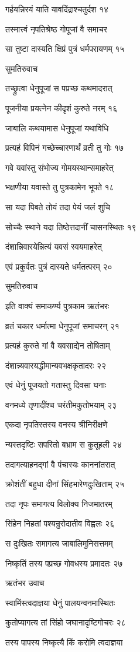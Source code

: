 गर्हयन्निरयं याति यावदिंद्राश्चतुर्दश १४

तस्मात्त्वं नृपतिश्रेष्ठ गोपूजां वै समाचर

सा तुष्टा दास्यति क्षिप्रं पुत्रं धर्मपरायणम् १५

सुमतिरुवाच

तच्छ्रुत्वा धेनुपूजां स पप्रच्छ कथमादरात्

पूजनीया प्रयत्नेन कीदृशं कुरुते नरम् १६

जाबालि कथयामास धेनुपूजां यथाविधि

प्रत्यहं विपिनं गच्छेच्चारणार्थं व्रती तु गोः १७

गवे यवांस्तु संभोज्य गोमयस्थान्समाहरेत्

भक्षणीया यवास्ते तु पुत्रकामेन भूपते १८

सा यदा पिबते तोयं तदा पेयं जलं शुचि

सोच्चैः स्थाने यदा तिष्ठेत्तदानीं चासनस्थितः १९

दंशान्निवारयेन्नित्यं यवसं स्वयमाहरेत्

एवं प्रकुर्वतः पुत्रं दास्यते धर्मतत्परम् २०

सुमतिरुवाच

इति वाक्यं समाकर्ण्य पुत्रकाम ऋतंभरः

व्रतं चकार धर्मात्मा धेनुपूजां समाचरन् २१

प्रत्यहं कुरुते गां वै यवसाद्येन तोषिताम्

दंशान्न्यवारयद्धीमान्यवभक्षकृतादरः २२

एवं धेनुं पूजयतो गतास्तु दिवसा घनाः

वनमध्ये तृणादींश्च चरंतीमकुतोभयाम् २३

एकदा नृपतिस्तस्य वनस्य श्रीनिरीक्षणे

न्यस्तदृष्टिः सपरितो बभ्राम स कुतूहली २४

तदागत्याहनद्गां वै पंचास्यः काननांतरात्

क्रोशंतीं बहुधा दीनां सिंहभारेणदुःखिताम् २५

तदा नृपः समागत्य विलोक्य निजमातरम्

सिंहेन निहतां पश्यन्रुरोदातीव विह्वलः २६

स दुःखितः समागत्य जाबालिमुनिसत्तमम्

निष्कृतिं तस्य पप्रच्छ गोवधस्य प्रमादतः २७

ऋतंभर उवाच

स्वामिंस्त्वदाज्ञया धेनुं पालयन्वनमास्थितः

कुतोप्यागत्य तां सिंहो जघानादृष्टिगोचरः २८

तस्य पापस्य निष्कृत्यै किं करोमि त्वदाज्ञया

